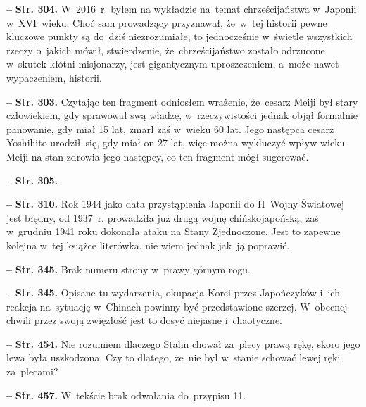 \documentclass[a4paper,11pt]{article}  %
\newcommand{\spaceFour}{0.5em}
\newcommand{\tb}{\textbf}
\newcommand{\noi}{\noindent}
\newcommand{\start}{\noi \tb{--} {}}
\newcommand{\Str}[1]{\tb{Str. #1.}}
\begin{document}
\start \Str{304} W~2016~r. byłem na wykładzie na~temat chrześcijaństwa
w~Japonii w~XVI~wieku. Choć sam prowadzący przyznawał, że~w~tej
historii pewne kluczowe punkty są do~dziś niezrozumiałe, to
jednocześnie w~świetle wszystkich rzeczy o~jakich mówił, stwierdzenie,
że~chrześcijaństwo zostało odrzucone w~skutek kłótni misjonarzy, jest
gigantycznym uproszczeniem, a~może nawet wypaczeniem, historii.

\vspace{\spaceFour}


\start \Str{303} Czytając ten fragment odniosłem wrażenie, że~cesarz
Meiji był stary człowiekiem, gdy sprawował swą władzę,
w~rzeczywistości jednak objął formalnie panowanie, gdy miał 15 lat,
zmarł zaś w~wieku 60 lat. Jego następca cesarz Yoshihito urodził~się,
gdy miał on 27 lat, więc można wykluczyć wpływ wieku Meiji na stan
zdrowia jego następcy, co ten fragment mógł sugerować.

\vspace{\spaceFour}


\start \Str{305}

\vspace{\spaceFour}


\start \Str{310} Rok 1944 jako data przystąpienia Japonii do II~Wojny
Światowej jest błędny, od 1937~r. prowadziła już drugą wojnę
chińsko\dywiz japońską, zaś w~grudniu 1941 roku dokonała ataku na
Stany Zjednoczone. Jest to zapewne kolejna w~tej książce literówka,
nie wiem jednak jak~ją poprawić.

\vspace{\spaceFour}


\start \Str{345} Brak numeru strony w~prawy górnym rogu.

\vspace{\spaceFour}


\start \Str{345} Opisane tu wydarzenia, okupacja Korei przez
Japończyków i~ich reakcja na~sytuację w~Chinach powinny być
przedstawione szerzej. W~obecnej chwili przez swoją zwięzłość jest to
dosyć niejasne i~chaotyczne.

\vspace{\spaceFour}


\start \Str{454} Nie rozumiem dlaczego Stalin chował za~plecy prawą
rękę, skoro jego lewa była uszkodzona. Czy to dlatego, że~nie był
w~stanie schować lewej ręki za~plecami?

\vspace{\spaceFour}


\start \Str{457} W~tekście brak odwołania do~przypisu 11.
\end{document}
